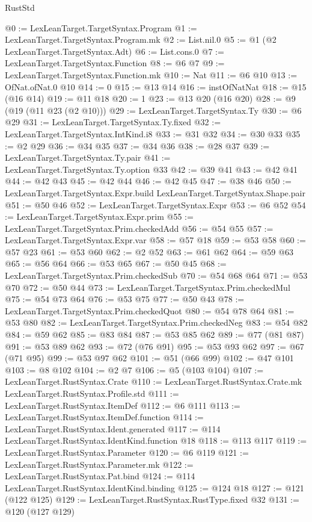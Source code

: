 \begin{lexlean}{RustStd}
\begin{coremodule}
@0 := LexLeanTarget.TargetSyntax.Program
@1 := LexLeanTarget.TargetSyntax.Program.mk
@2 := List.nil.{0}
@5 := @1 (@2 LexLeanTarget.TargetSyntax.Adt)
@6 := List.cons.{0}
@7 := LexLeanTarget.TargetSyntax.Function
@8 := @6 @7
@9 := LexLeanTarget.TargetSyntax.Function.mk
@10 := Nat
@11 := @6 @10
@13 := OfNat.ofNat.{0} @10
@14 := 0
@15 := @13 @14
@16 := instOfNatNat
@18 := @15 (@16 @14)
@19 := @11 @18
@20 := 1
@23 := @13 @20 (@16 @20)
@28 := @9 (@19 (@11 @23 (@2 @10)))
@29 := LexLeanTarget.TargetSyntax.Ty
@30 := @6 @29
@31 := LexLeanTarget.TargetSyntax.Ty.fixed
@32 := LexLeanTarget.TargetSyntax.IntKind.i8
@33 := @31 @32
@34 := @30 @33
@35 := @2 @29
@36 := @34 @35
@37 := @34 @36
@38 := @28 @37
@39 := LexLeanTarget.TargetSyntax.Ty.pair
@41 := LexLeanTarget.TargetSyntax.Ty.option @33
@42 := @39 @41
@43 := @42 @41
@44 := @42 @43
@45 := @42 @44
@46 := @42 @45
@47 := @38 @46
@50 := LexLeanTarget.TargetSyntax.Expr.build LexLeanTarget.TargetSyntax.Shape.pair
@51 := @50 @46
@52 := LexLeanTarget.TargetSyntax.Expr
@53 := @6 @52
@54 := LexLeanTarget.TargetSyntax.Expr.prim
@55 := LexLeanTarget.TargetSyntax.Prim.checkedAdd
@56 := @54 @55
@57 := LexLeanTarget.TargetSyntax.Expr.var
@58 := @57 @18
@59 := @53 @58
@60 := @57 @23
@61 := @53 @60
@62 := @2 @52
@63 := @61 @62
@64 := @59 @63
@65 := @56 @64
@66 := @53 @65
@67 := @50 @45
@68 := LexLeanTarget.TargetSyntax.Prim.checkedSub
@70 := @54 @68 @64
@71 := @53 @70
@72 := @50 @44
@73 := LexLeanTarget.TargetSyntax.Prim.checkedMul
@75 := @54 @73 @64
@76 := @53 @75
@77 := @50 @43
@78 := LexLeanTarget.TargetSyntax.Prim.checkedQuot
@80 := @54 @78 @64
@81 := @53 @80
@82 := LexLeanTarget.TargetSyntax.Prim.checkedNeg
@83 := @54 @82
@84 := @59 @62
@85 := @83 @84
@87 := @53 @85 @62
@89 := @77 (@81 @87)
@91 := @53 @89 @62
@93 := @72 (@76 @91)
@95 := @53 @93 @62
@97 := @67 (@71 @95)
@99 := @53 @97 @62
@101 := @51 (@66 @99)
@102 := @47 @101
@103 := @8 @102
@104 := @2 @7
@106 := @5 (@103 @104)
@107 := LexLeanTarget.RustSyntax.Crate
@110 := LexLeanTarget.RustSyntax.Crate.mk LexLeanTarget.RustSyntax.Profile.std
@111 := LexLeanTarget.RustSyntax.ItemDef
@112 := @6 @111
@113 := LexLeanTarget.RustSyntax.ItemDef.function
@114 := LexLeanTarget.RustSyntax.Ident.generated
@117 := @114 LexLeanTarget.RustSyntax.IdentKind.function @18
@118 := @113 @117
@119 := LexLeanTarget.RustSyntax.Parameter
@120 := @6 @119
@121 := LexLeanTarget.RustSyntax.Parameter.mk
@122 := LexLeanTarget.RustSyntax.Pat.bind
@124 := @114 LexLeanTarget.RustSyntax.IdentKind.binding
@125 := @124 @18
@127 := @121 (@122 @125)
@129 := LexLeanTarget.RustSyntax.RustType.fixed @32
@131 := @120 (@127 @129)

\end{coremodule}
\end{lexlean}
